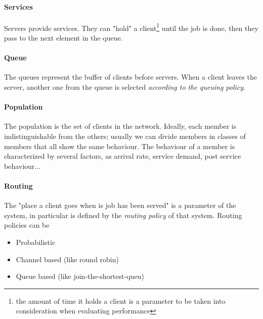 \documentclass[10pt,a4paper]{article}
\begin{document}
					\paragraph{Services}
						Servers provide services. They can "hold" a client\footnote{the amount of time it holds a client is a parameter to be taken into consideration when evaluating performance} until the job is done, then they pass to the next element in the queue.
						
					\paragraph{Queue}
						The queues represent the buffer of clients before servers. When a client leaves the server, another one from the queue is selected \emph{according to the queuing policy}.
						
					\paragraph{Population}
						The population is the set of clients in the network. Ideally, each member is indistinguishable from the others; usually we can divide members in classes of members that all show the same behaviour. The behaviour of a member is characterized by several factors, as arrival rate, service demand, post service behaviour...
						
					\paragraph{Routing}
						The "place a client goes when is job has been served" is a parameter of the system, in particular is defined by the \emph{routing policy} of that system. Routing policies can be
						\begin{itemize}
							\item Probabilistic
							\item Channel based (like round robin)
							\item Queue based (like join-the-shortest-queu)
						\end{itemize}
			
\end{document}
